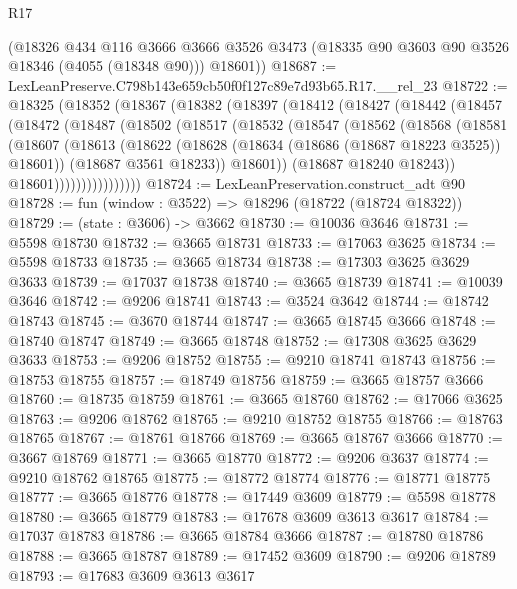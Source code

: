\begin{lexlean}{R17}
\begin{coremodule}
      (@18326
        @434
        @116
        @3666
        @3666
        @3526
        @3473
        (@18335 @90 @3603 @90 @3526 @18346 (@4055 (@18348 @90)))
        @18601))
@18687 := LexLeanPreserve.C798b143e659cb50f0f127c89e7d93b65.R17.__rel_23
@18722 := @18325
    (@18352
      (@18367
        (@18382
          (@18397
            (@18412
              (@18427
                (@18442
                  (@18457
                    (@18472
                      (@18487
                        (@18502
                          (@18517
                            (@18532
                              (@18547
                                (@18562
                                  (@18568
                                    (@18581
                                      (@18607
                                        (@18613
                                          (@18622
                                            (@18628 (@18634 (@18686 (@18687 @18223 @3525)) @18601))
                                            (@18687 @3561 @18233))
                                          @18601))
                                      (@18687 @18240 @18243))
                                    @18601))))))))))))))))
@18724 := LexLeanPreservation.construct_adt @90
@18728 := fun (window : @3522) => @18296 (@18722 (@18724 @18322))
@18729 := (state : @3606) -> @3662
@18730 := @10036 @3646
@18731 := @5598 @18730
@18732 := @3665 @18731
@18733 := @17063 @3625
@18734 := @5598 @18733
@18735 := @3665 @18734
@18738 := @17303 @3625 @3629 @3633
@18739 := @17037 @18738
@18740 := @3665 @18739
@18741 := @10039 @3646
@18742 := @9206 @18741
@18743 := @3524 @3642
@18744 := @18742 @18743
@18745 := @3670 @18744
@18747 := @3665 @18745 @3666
@18748 := @18740 @18747
@18749 := @3665 @18748
@18752 := @17308 @3625 @3629 @3633
@18753 := @9206 @18752
@18755 := @9210 @18741 @18743
@18756 := @18753 @18755
@18757 := @18749 @18756
@18759 := @3665 @18757 @3666
@18760 := @18735 @18759
@18761 := @3665 @18760
@18762 := @17066 @3625
@18763 := @9206 @18762
@18765 := @9210 @18752 @18755
@18766 := @18763 @18765
@18767 := @18761 @18766
@18769 := @3665 @18767 @3666
@18770 := @3667 @18769
@18771 := @3665 @18770
@18772 := @9206 @3637
@18774 := @9210 @18762 @18765
@18775 := @18772 @18774
@18776 := @18771 @18775
@18777 := @3665 @18776
@18778 := @17449 @3609
@18779 := @5598 @18778
@18780 := @3665 @18779
@18783 := @17678 @3609 @3613 @3617
@18784 := @17037 @18783
@18786 := @3665 @18784 @3666
@18787 := @18780 @18786
@18788 := @3665 @18787
@18789 := @17452 @3609
@18790 := @9206 @18789
@18793 := @17683 @3609 @3613 @3617

\end{coremodule}
\end{lexlean}
